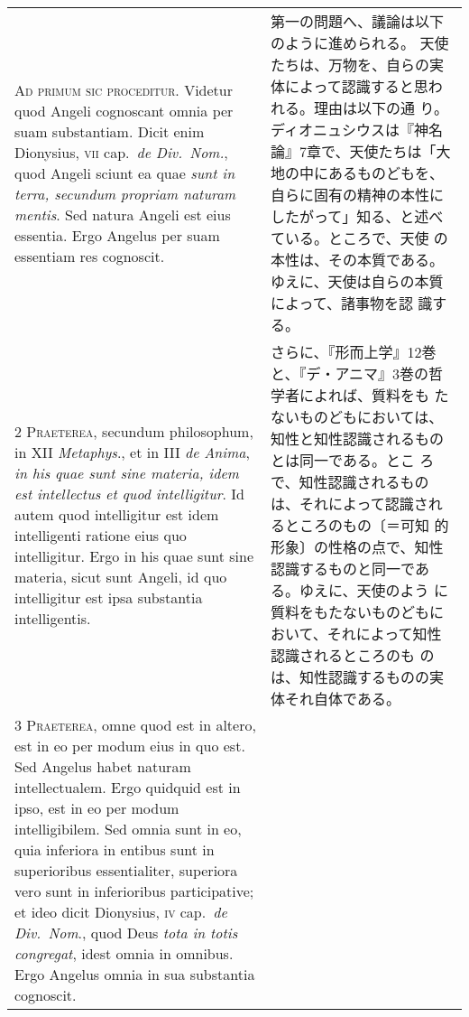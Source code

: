 \documentclass[10pt]{jsarticle} %
\begin{document}
\begin{longtable}{p{21em}p{21em}}


{\huge A}{\scshape d primum sic proceditur}. Videtur quod Angeli
cognoscant omnia per suam substantiam. Dicit enim Dionysius, {\scshape
 vii} cap.~{\itshape de Div.~Nom.}, quod Angeli sciunt ea quae {\itshape sunt in terra, secundum propriam
naturam mentis}. Sed natura Angeli est eius essentia. Ergo Angelus per
suam essentiam res cognoscit.


&

第一の問題へ、議論は以下のように進められる。
天使たちは、万物を、自らの実体によって認識すると思われる。理由は以下の通
 り。
ディオニュシウスは『神名論』7章で、天使たちは「大地の中にあるものどもを、
 自らに固有の精神の本性にしたがって」知る、と述べている。ところで、天使
 の本性は、その本質である。ゆえに、天使は自らの本質によって、諸事物を認
 識する。

\\


{\scshape 2 Praeterea}, secundum philosophum, in XII {\itshape Metaphys}., et in
III {\itshape de Anima}, {\itshape in his quae sunt sine materia, idem est intellectus et
quod intelligitur}. Id autem quod intelligitur est idem intelligenti
ratione eius quo intelligitur. Ergo in his quae sunt sine materia, sicut
sunt Angeli, id quo intelligitur est ipsa substantia intelligentis.

&

さらに、『形而上学』12巻と、『デ・アニマ』3巻の哲学者によれば、質料をも
 たないものどもにおいては、知性と知性認識されるものとは同一である。とこ
 ろで、知性認識されるものは、それによって認識されるところのもの〔＝可知
 的形象〕の性格の点で、知性認識するものと同一である。ゆえに、天使のよう
 に質料をもたないものどもにおいて、それによって知性認識されるところのも
 のは、知性認識するものの実体それ自体である。


\\


{\scshape 3 Praeterea}, omne quod est in altero, est in eo per modum
eius in quo est. Sed Angelus habet naturam intellectualem. Ergo quidquid
est in ipso, est in eo per modum intelligibilem. Sed omnia sunt in eo,
quia inferiora in entibus sunt in superioribus essentialiter, superiora
vero sunt in inferioribus participative; et ideo dicit Dionysius, {\scshape iv}
cap.~{\itshape de Div.~Nom}., quod Deus {\itshape tota in totis congregat}, idest omnia in
omnibus. Ergo Angelus omnia in sua substantia cognoscit.

&


\end{longtable}
\end{document}

